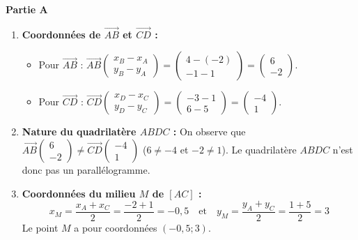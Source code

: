 \documentclass[11pt,a4paper]{article}
\newcommand{\partie}[1]{%
  \vspace{0.9em}%
  \noindent\textbf{#1}%
  \par\vspace{0.3em}%
}
\begin{document}
\partie{Partie A}
\begin{enumerate}
  \item \textbf{Coordonnées de $\vec{AB}$ et $\vec{CD}$ :}
  \begin{itemize}
    [label=$\bullet$,leftmargin=1.5em]
    \item Pour $\vec{AB}$ : $\vec{AB}\begin{pmatrix} x_B - x_A \\ y_B - y_A \end{pmatrix} = \begin{pmatrix} 4 - (-2) \\ -1 - 1 \end{pmatrix} = \begin{pmatrix} 6 \\ -2 \end{pmatrix}$.
    \item Pour $\vec{CD}$ : $\vec{CD}\begin{pmatrix} x_D - x_C \\ y_D - y_C \end{pmatrix} = \begin{pmatrix} -3 - 1 \\ 6 - 5 \end{pmatrix} = \begin{pmatrix} -4 \\ 1 \end{pmatrix}$.
  \end{itemize}
  \item \textbf{Nature du quadrilatère $ABDC$ :}
  On observe que $\vec{AB}\begin{pmatrix} 6 \\ -2 \end{pmatrix} \neq \vec{CD}\begin{pmatrix} -4 \\ 1 \end{pmatrix}$ ($6 \neq -4$ et $-2 \neq 1$). Le quadrilatère $ABDC$ n'est donc pas un parallélogramme.
  \item \textbf{Coordonnées du milieu $M$ de $[AC]$ :}
  $$x_M = \frac{x_A + x_C}{2} = \frac{-2 + 1}{2} = -0{,}5 \quad \text{et} \quad y_M = \frac{y_A + y_C}{2} = \frac{1 + 5}{2} = 3$$
  Le point $M$ a pour coordonnées $(-0{,}5 ; 3)$.
\end{enumerate}
\end{document}
